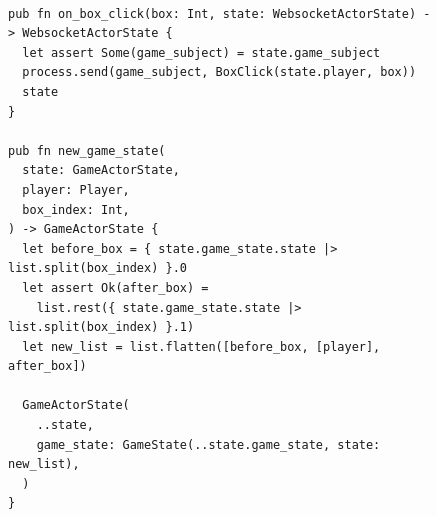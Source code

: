 \documentclass[]{project_interim}
\begin{document}
\begin{figure}
  \begin{lstlisting}

pub fn on_box_click(box: Int, state: WebsocketActorState) -> WebsocketActorState {
  let assert Some(game_subject) = state.game_subject
  process.send(game_subject, BoxClick(state.player, box))
  state
}

pub fn new_game_state(
  state: GameActorState,
  player: Player,
  box_index: Int,
) -> GameActorState {
  let before_box = { state.game_state.state |> list.split(box_index) }.0
  let assert Ok(after_box) =
    list.rest({ state.game_state.state |> list.split(box_index) }.1)
  let new_list = list.flatten([before_box, [player], after_box])

  GameActorState(
    ..state,
    game_state: GameState(..state.game_state, state: new_list),
  )
}


\end{lstlisting}
\end{figure}
\end{document}
